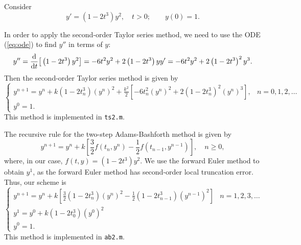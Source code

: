 \documentclass{homework}
\begin{document}
	\maketitle
	
	\question
	Consider
	\begin{equation}
		\label{eq:ode}
		y' = \left(1-2t^3\right)y^2, \quad t > 0; \qquad y(0) = 1.
	\end{equation}
	
	\begin{alphaparts}
		\questionpart In order to apply the second-order Taylor series method, we need to use the ODE (\ref{eq:ode}) to find $y''$ in terms of $y$:
		\begin{equation*}
			y'' = \frac{\text{d} {}}{\text{d} {t}}\big[\left(1-2t^3\right)y^2\big] = -6t^2y^2 + 2\left(1-2t^3\right)yy' = -6t^2y^2 + 2\left(1-2t^3\right)^2y^3.
		\end{equation*}
		Then the second-order Taylor series method is given by
		\begin{equation*}
			\begin{cases}
				y^{n+1} = y^n + k\left(1-2t_n^3\right)\left(y^n\right)^2 + \frac{k^2}{2}\left[-6t_n^2\left(y^n\right)^2 + 2\left(1-2t_n^3\right)^2\left(y^n\right)^3\right], & n = 0,1,2,\dots \\
				y^0 = 1.
			\end{cases}
		\end{equation*}
		This method is implemented in \verb*|ts2.m|.
		
		\questionpart The recursive rule for the two-step Adams-Bashforth method is given by 
		\begin{equation*}
			y^{n+1} = y^n + k\left[\frac{3}{2}f\left(t_n, y^n\right) - \frac{1}{2}f\left(t_{n-1}, y^{n-1}\right)\right], \quad n \ge 0,
		\end{equation*}
		where, in our case, $f(t,y) = \left(1-2t^3\right)y^2$. We use the forward Euler method to obtain $y^1$, as the forward Euler method has second-order local truncation error. Thus, our scheme is
		\begin{equation*}
			\begin{cases}
				y^{n+1} = y^n + k\left[\frac{3}{2}\left(1-2t_n^3\right)\left(y^n\right)^2 - \frac{1}{2}\left(1-2t_{n-1}^3\right)\left(y^{n-1}\right)^2\right] & n = 1, 2, 3,\dots \\
				y^1 = y^0 + k\left(1-2t_0^3\right)\left(y^0\right)^2 \\
				y^0 = 1.
			\end{cases}
		\end{equation*}
		This method is implemented in \verb*|ab2.m|.
		

\end{alphaparts}
\end{document}
